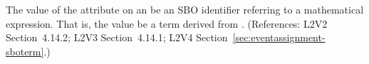 The value of the  attribute on an \EventAssignment {} be an
SBO identifier referring to a mathematical expression.  That is, the value
 be a term derived from \sbomathformula.  (References: L2V2 Section~4.14.2;
L2V3 Section~4.14.1; L2V4 Section~\ref{sec:eventassignment-sboterm}.)
